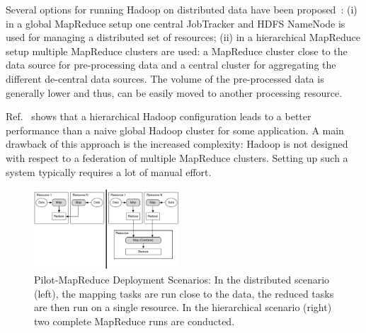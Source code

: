\documentclass{acm_proc_article-sp}
\newcommand{\jhanote}[1]{ {\textcolor{red} { ***SJ: #1 }}}
\newcommand{\alnote}[1]{ {\textcolor{blue} { ***andreL: #1 }}}
\newcommand{\alnote}[1]{}
\newcommand{\jhanote}[1]{}
\newcommand{\pilotmapreduce}{Pilot-MapReduce\xspace}
\begin{document}
Several options for running Hadoop on distributed data have been
proposed~\cite{weissman-mr-11}: (i) in a global MapReduce setup one
central JobTracker and HDFS NameNode is used for managing a
distributed set of resources; (ii) in a hierarchical MapReduce setup
multiple MapReduce clusters are used: a MapReduce cluster close to the
data source for pre-processing data and a central cluster for
aggregating the different de-central data sources. The volume of the
pre-processed data is generally lower and thus, can be easily moved to
another processing resource. 

Ref.~\cite{weissman-mr-11} shows that a hierarchical Hadoop
configuration leads to a better performance than a naive global Hadoop
cluster for some application. A main drawback of this approach is the
increased complexity: Hadoop is not designed with respect to a
federation of multiple MapReduce clusters. Setting up such a
system typically requires a lot of manual effort.  


  


\begin{figure}
	\centering
	\includegraphics[width=0.48\textwidth]{figures/distributed_hierachical.pdf}
	\caption{\pilotmapreduce Deployment Scenarios: In the
          distributed scenario (left), the mapping tasks are run close
          to the data, the reduced tasks are then run on a single
          resource. In the hierarchical scenario (right) two complete
          MapReduce runs are
          conducted. \label{fid:distributed-mapreduce-overview}}
\end{figure}
\end{document}
